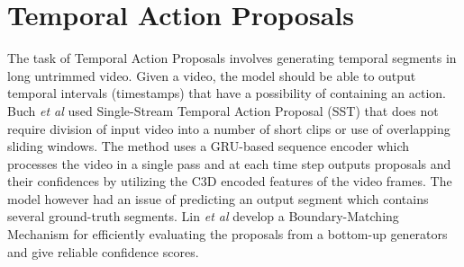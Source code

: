 \section{Temporal Action Proposals}
\par The task of Temporal Action Proposals involves generating temporal segments in long untrimmed video. Given a video, the model should be able to output temporal intervals (timestamps) that have a possibility of containing an action. Buch \textit{et al} \cite{buch2017sst} used Single-Stream Temporal Action Proposal (SST) that does not require division of input video into a number of short clips or use of overlapping sliding windows. The method uses a GRU-based sequence encoder which processes the video in a single pass and at each time step outputs proposals and their confidences by utilizing the C3D encoded features of the video frames. The model however had an issue of predicting an output segment which contains several ground-truth segments. Lin \textit{et al} \cite{lin2019bmn} develop a Boundary-Matching Mechanism for efficiently evaluating the proposals from a bottom-up generators and give reliable confidence scores.

